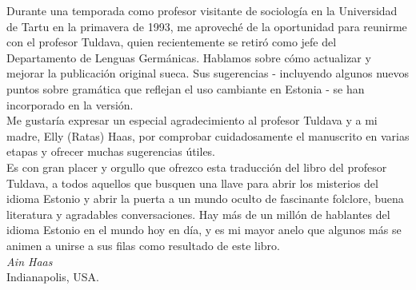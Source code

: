 Durante una temporada como profesor visitante de sociología en la Universidad de Tartu en la primavera de 1993, me aproveché de la oportunidad para reunirme con el profesor Tuldava, quien recientemente se retiró como jefe del Departamento de Lenguas Germánicas. Hablamos sobre cómo actualizar y mejorar la publicación original sueca. Sus sugerencias - incluyendo algunos nuevos puntos sobre gramática que reflejan el uso cambiante en Estonia - se han incorporado en la versión.\\

Me gustaría expresar un especial agradecimiento al profesor Tuldava y a mi madre, Elly (Ratas) Haas, por comprobar cuidadosamente el manuscrito en varias etapas y ofrecer muchas sugerencias útiles.\\

Es con gran placer y orgullo que ofrezco esta traducción del libro del profesor Tuldava, a todos aquellos que busquen una llave para abrir los misterios del idioma Estonio y abrir la puerta a un mundo oculto de fascinante folclore, buena literatura y agradables conversaciones. Hay más de un millón de hablantes del idioma Estonio en el mundo hoy en día, y es mi mayor anelo que algunos más se animen a unirse a sus filas como resultado de este libro.\\

\textit{Ain Haas}\\
Indianapolis, USA.



